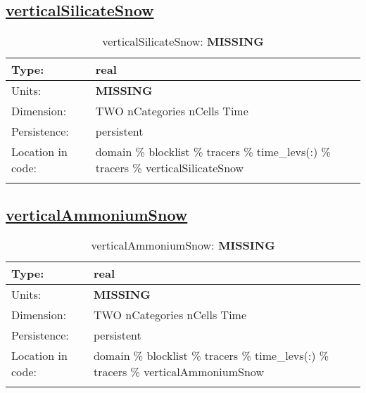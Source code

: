 \subsection[verticalSilicateSnow]{\hyperref[sec:var_tab_tracers]{verticalSilicateSnow}}
\label{subsec:var_sec_tracers_verticalSilicateSnow}
\begin{center}
\begin{longtable}{| p{2.0in} | p{4.0in} |}
        \hline 
        Type: & real \\
        \hline 
        Units: & {\bf \color{red} MISSING} \\
        \hline 
        Dimension: & TWO nCategories nCells Time \\
        \hline 
        Persistence: & persistent \\
        \hline 
         Location in code: & domain \% blocklist \% tracers \% time\_levs(:) \% tracers \% verticalSilicateSnow \\
         \hline 
    \caption{verticalSilicateSnow: {\bf \color{red} MISSING}}
\end{longtable}
\end{center}
\subsection[verticalAmmoniumSnow]{\hyperref[sec:var_tab_tracers]{verticalAmmoniumSnow}}
\label{subsec:var_sec_tracers_verticalAmmoniumSnow}
\begin{center}
\begin{longtable}{| p{2.0in} | p{4.0in} |}
        \hline 
        Type: & real \\
        \hline 
        Units: & {\bf \color{red} MISSING} \\
        \hline 
        Dimension: & TWO nCategories nCells Time \\
        \hline 
        Persistence: & persistent \\
        \hline 
         Location in code: & domain \% blocklist \% tracers \% time\_levs(:) \% tracers \% verticalAmmoniumSnow \\
         \hline 
    \caption{verticalAmmoniumSnow: {\bf \color{red} MISSING}}
\end{longtable}
\end{center}
